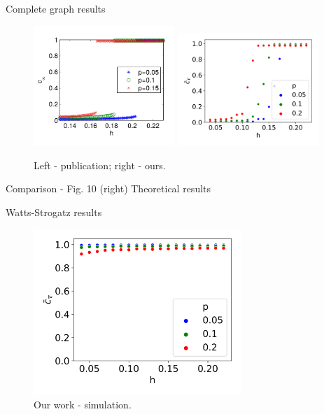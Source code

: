 \documentclass[10pt]{beamer}
\begin{document}
\begin{frame}{Complete graph results}
	\begin{figure}
		\includegraphics[width=0.475\textwidth]{../resources/images/fig10-right.png}
		\hfill
		\includegraphics[width=0.475\textwidth]{../results/images/hp-complete.png}
		\caption{Left - publication; right - ours.}
	\end{figure}
	Comparison - Fig. 10 (right)
	Theoretical results
\end{frame}

\begin{frame}{Watts-Strogatz results}
	\begin{figure}
		\includegraphics[width=0.7\textwidth]{../results/images/hp-watts-strogatz.png}
		\caption{Our work - simulation.}
	\end{figure}
\end{frame}
\end{document}
